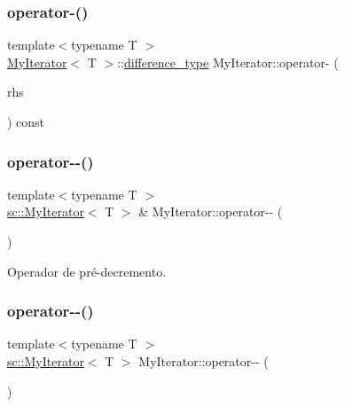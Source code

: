 \subsubsection{\texorpdfstring{operator-\/()}{operator-()}\hspace{0.1cm}{\footnotesize\ttfamily [2/2]}}
{\footnotesize\ttfamily template$<$typename T $>$ \\
\hyperlink{classsc_1_1MyIterator}{My\+Iterator}$<$ T $>$\+::\hyperlink{classsc_1_1MyIterator_ab37e30d9d7abaca8b7ed9c4ba7371798}{difference\+\_\+type} My\+Iterator\+::operator-\/ (\begin{DoxyParamCaption}\item[{const \hyperlink{classsc_1_1MyIterator}{My\+Iterator}$<$ T $>$ \&}]{rhs }\end{DoxyParamCaption}) const}

\mbox{\label{classsc_1_1MyIterator_a6f96be4dbb7b53cc4e6a39f977a9babb}} 
\subsubsection{\texorpdfstring{operator-\/-\/()}{operator--()}\hspace{0.1cm}{\footnotesize\ttfamily [1/2]}}
{\footnotesize\ttfamily template$<$typename T $>$ \\
\hyperlink{classsc_1_1MyIterator}{sc\+::\+My\+Iterator}$<$ T $>$ \& My\+Iterator\+::operator-\/-\/ (\begin{DoxyParamCaption}\item[{void}]{ }\end{DoxyParamCaption})}



Operador de pré-\/decremento. 

\mbox{\label{classsc_1_1MyIterator_a5b8ef57da66d65e8e95a1ae01cc79252}} 
\subsubsection{\texorpdfstring{operator-\/-\/()}{operator--()}\hspace{0.1cm}{\footnotesize\ttfamily [2/2]}}
{\footnotesize\ttfamily template$<$typename T $>$ \\
\hyperlink{classsc_1_1MyIterator}{sc\+::\+My\+Iterator}$<$ T $>$ My\+Iterator\+::operator-\/-\/ (\begin{DoxyParamCaption}\item[{int}]{ }\end{DoxyParamCaption})}



